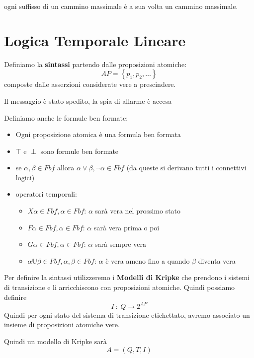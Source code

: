 ogni suffisso di un cammino massimale è a sua volta un cammino massimale.
\section{Logica Temporale Lineare}
Definiamo la \textbf{sintassi} partendo dalle proposizioni atomiche:
\begin{equation}
    AP=\left\{ p_1,p_2,\dots \right\}
\end{equation}
composte dalle asserzioni considerate vere a prescindere.
\begin{esempio}
    Il messaggio è stato spedito, la spia di allarme è accesa
\end{esempio}

Definiamo anche le formule ben formate:
\begin{itemize}
    \item Ogni proposizione atomica è una formula ben formata
    \item $\top$ e $\perp$ sono formule ben formate
    \item se $\alpha,\beta\in Fbf$ allora $\alpha\lor \beta,\lnot \alpha \in Fbf$ 
    (da queste si derivano tutti i connettivi logici)
    \item operatori temporali: 
    \begin{itemize}
        \item $X\alpha \in Fbf, \alpha \in Fbf$: $\alpha$ sarà vera nel prossimo stato
        \item $F\alpha \in Fbf, \alpha \in Fbf$: $\alpha$ sarà vera prima o poi
        \item $G\alpha \in Fbf, \alpha \in Fbf$: $\alpha$ sarà sempre vera
        \item $\alpha\mathbb{U}\beta \in Fbf, \alpha,\beta \in Fbf$: $\alpha$ è vera 
            ameno fino a quando $\beta$ diventa vera
    \end{itemize}
\end{itemize}

Per definire la sintassi utilizzeremo i \textbf{Modelli di Kripke} che prendono
i sistemi di transizione e li arricchiscono con proposizioni atomiche. Quindi possiamo 
definire
\begin{equation}
    I \ : \ Q \rightarrow 2 ^{AP}
\end{equation}
Quindi per ogni stato del sistema di transizione etichettato, avremo associato un
insieme di proposizioni atomiche vere.

Quindi un modello di Kripke sarà 
\begin{equation}
    A=(Q,T,I)
\end{equation}

